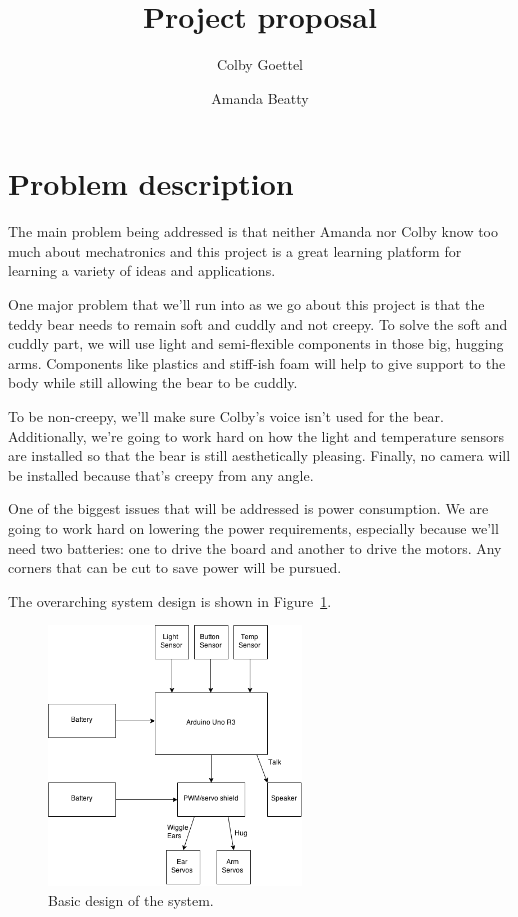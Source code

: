 \documentclass{article}
\title{Project proposal}
\author{Colby Goettel\and Amanda Beatty}
\begin{document}
\maketitle

\section{Problem description}

The main problem being addressed is that neither Amanda nor Colby know too much about mechatronics and this project is a great learning platform for learning a variety of ideas and applications.

One major problem that we'll run into as we go about this project is that the teddy bear needs to remain soft and cuddly and not creepy. To solve the soft and cuddly part, we will use light and semi-flexible components in those big, hugging arms. Components like plastics and stiff-ish foam will help to give support to the body while still allowing the bear to be cuddly.

To be non-creepy, we'll make sure Colby's voice isn't used for the bear. Additionally, we're going to work hard on how the light and temperature sensors are installed so that the bear is still aesthetically pleasing. Finally, no camera will be installed because that's creepy from any angle.

One of the biggest issues that will be addressed is power consumption. We are going to work hard on lowering the power requirements, especially because we'll need two batteries: one to drive the board and another to drive the motors. Any corners that can be cut to save power will be pursued.

The overarching system design is shown in Figure~\ref{fig:system}.

\begin{figure}[h!b]
    \centering
    \includegraphics[width=0.6\textwidth]{basic-structure}
    \caption{Basic design of the system.}
    \label{fig:system}
\end{figure}
\end{document}
